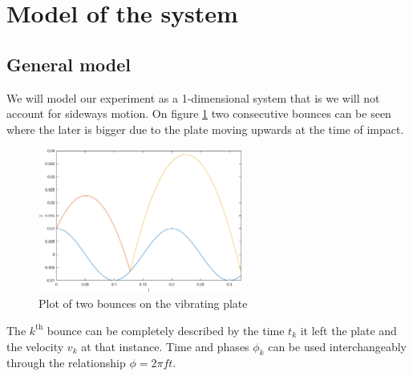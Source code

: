 \documentclass[12pt,oneside,a4paper]{article}
\numberwithin{equation}{section}
\begin{document}
{{{{\section{Model of the system}
\subsection{General model}
We will model our experiment as a 1-dimensional system that is we will not account for sideways motion. On figure \ref{bounces} two consecutive bounces can be seen where the later is bigger due to the plate  moving upwards at the time of impact.
\begin{figure}[H]
	\centering
	\includegraphics[width=0.6\textwidth]{Figures/bounceplot.eps}
	\caption{Plot of two bounces on the vibrating plate}
	\label{bounces}
\end{figure}
The $k^{\text{th}}$ bounce can be completely described by the time $t_k$ it left the plate and the velocity $v_k$ at that instance. Time and phases $\phi_k$ can be used interchangeably through the relationship $\phi=2\pi f t$.

}}}}
\end{document}

